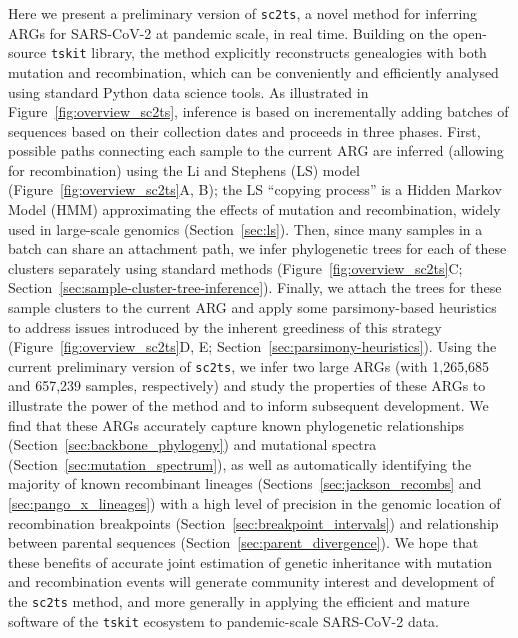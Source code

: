 \documentclass{article}
\begin{document}
Here we present a preliminary version of \texttt{sc2ts}, a novel method
for inferring ARGs for SARS-CoV-2 at pandemic scale, in real time.
Building on the open-source \texttt{tskit} library, the method
explicitly reconstructs genealogies with both
mutation and recombination, which
can be conveniently and efficiently analysed using standard Python data science
tools. As illustrated in Figure~\ref{fig:overview_sc2ts}, inference is based on incrementally adding batches of sequences
based on their collection dates and proceeds in three phases.
First, possible paths connecting each sample to the current ARG
are inferred (allowing for recombination) using the
Li and Stephens (LS) model (Figure~\ref{fig:overview_sc2ts}A, B);
the LS ``copying process'' is a Hidden Markov Model (HMM)
approximating the effects of mutation
and recombination, widely used in large-scale genomics (Section~\ref{sec:ls}).
Then, since many samples
in a batch can share an attachment path,
we infer phylogenetic trees for each of these clusters separately using standard methods
(Figure~\ref{fig:overview_sc2ts}C; Section~\ref{sec:sample-cluster-tree-inference}).
Finally, we attach the trees for these sample clusters to the current
ARG and apply some parsimony-based heuristics to address issues
introduced by the inherent greediness of this strategy
(Figure~\ref{fig:overview_sc2ts}D, E; Section~\ref{sec:parsimony-heuristics}).
Using the current preliminary version of \texttt{sc2ts}, we infer two
large ARGs (with 1,265,685 and 657,239 samples, respectively) and study
the properties of these ARGs to illustrate the power of the method
and to inform subsequent development.
We find that these
ARGs accurately capture known phylogenetic
relationships (Section~\ref{sec:backbone_phylogeny}) and
mutational spectra (Section~\ref{sec:mutation_spectrum}),
as well as automatically identifying the majority of known recombinant
lineages (Sections~\ref{sec:jackson_recombs} and \ref{sec:pango_x_lineages})
with a high level of precision in the
genomic location of recombination breakpoints
(Section~\ref{sec:breakpoint_intervals})
and relationship between parental sequences
(Section~\ref{sec:parent_divergence}).
We hope that these benefits of accurate joint estimation of
genetic inheritance with mutation and recombination events will generate community
interest and development of the \texttt{sc2ts} method, and
more generally in applying the efficient and mature software
of the \texttt{tskit} ecosystem to pandemic-scale SARS-CoV-2 data.
\end{document}
